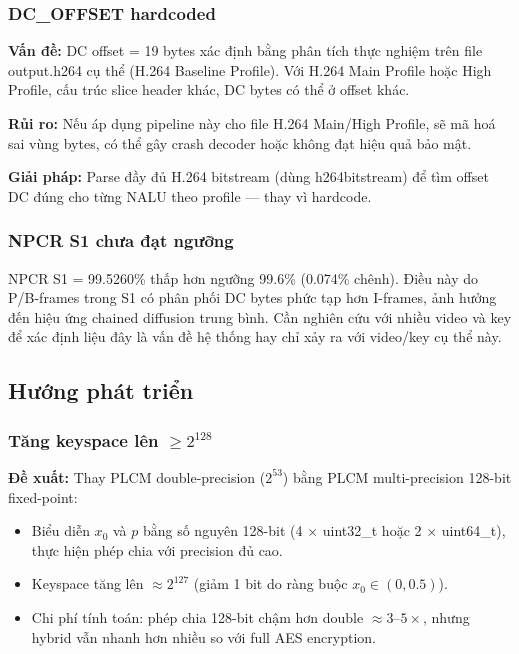\subsubsection{DC\_OFFSET hardcoded}

\textbf{Vấn đề:} DC offset = 19 bytes xác định bằng phân tích thực nghiệm
trên file output.h264 cụ thể (H.264 Baseline Profile). Với H.264 Main Profile
hoặc High Profile, cấu trúc slice header khác, DC bytes có thể ở offset khác.

\textbf{Rủi ro:} Nếu áp dụng pipeline này cho file H.264 Main/High Profile,
sẽ mã hoá sai vùng bytes, có thể gây crash decoder hoặc không đạt hiệu quả bảo mật.

\textbf{Giải pháp:} Parse đầy đủ H.264 bitstream (dùng h264bitstream) để tìm
offset DC đúng cho từng NALU theo profile --- thay vì hardcode.

\subsubsection{NPCR S1 chưa đạt ngưỡng}

NPCR S1 = 99.5260\% thấp hơn ngưỡng 99.6\% (0.074\% chênh). Điều này
do P/B-frames trong S1 có phân phối DC bytes phức tạp hơn I-frames,
ảnh hưởng đến hiệu ứng chained diffusion trung bình.
Cần nghiên cứu với nhiều video và key để xác định liệu đây là vấn đề hệ thống
hay chỉ xảy ra với video/key cụ thể này.

\subsection{Hướng phát triển}

\subsubsection{Tăng keyspace lên $\geq 2^{128}$}

\textbf{Đề xuất:} Thay PLCM double-precision ($2^{53}$) bằng PLCM multi-precision
128-bit fixed-point:

\begin{itemize}
  \item Biểu diễn $x_0$ và $p$ bằng số nguyên 128-bit (4 $\times$ uint32\_t hoặc
        2 $\times$ uint64\_t), thực hiện phép chia với precision đủ cao.
  \item Keyspace tăng lên $\approx 2^{127}$ (giảm 1 bit do ràng buộc $x_0 \in (0, 0.5)$).
  \item Chi phí tính toán: phép chia 128-bit chậm hơn double $\approx 3$--$5\times$,
        nhưng hybrid vẫn nhanh hơn nhiều so với full AES encryption.
\end{itemize}

